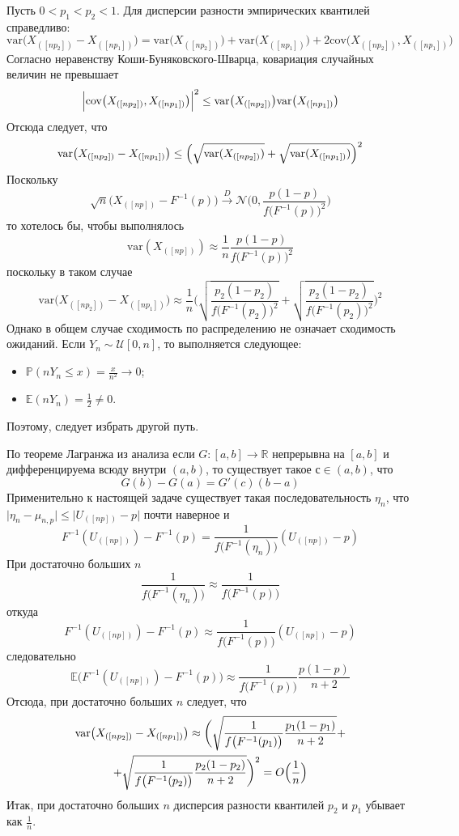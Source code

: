 \documentclass[a4paper]{article}
\newcommand{\Real}{\mathbb{R}}
\newcommand{\Ncal}{\mathcal{N}}
\newcommand{\ex}[0]{{\mathbb{E}}}
\newcommand{\pr}[0]{{\mathbb{P}}}
\newcommand{\var}[0]{\text{var}}
\begin{document}
Пусть $0<p_1<p_2<1$. Для дисперсии разности эмпирических квантилей справедливо:
\[
\var\bigl(X_{([np_2])}-X_{([np_1])}\bigr)
= \var\bigl(X_{([np_2])}\bigr) +\var\bigl(X_{([np_1])}\bigr)
	+2 \text{cov}\bigl(X_{([np_2])},X_{([np_1])}\bigr)
\]
Согласно неравенству Коши-Буняковского-Шварца, ковариация случайных величин не превышает
\[
\Bigl\lvert \text{cov}\bigl(X_{([np_2])},X_{([np_1])}\bigr)\Bigr\rvert^2
\leq \var\bigl(X_{([np_2])}\bigr)\var\bigl(X_{([np_1])}\bigr)
\]
Отсюда следует, что
\[
\var\bigl(X_{([np_2])}-X_{([np_1])}\bigr)
\leq \Bigl( \sqrt{\var(X_{([np_2])})} + \sqrt{\var(X_{([np_1])})} \Bigr)^2
\]
Поскольку
\[
\sqrt{n}\bigl(X_{([np])}-F^{-1}(p)\bigr)
\overset{D}{\to}
\Ncal\bigl(0,\frac{p(1-p)}{f\bigl(F^{-1}(p)\bigr)^2}\bigr)
\]
то хотелось бы, чтобы выполнялось
\[\var(X_{([np])}) \approx \frac{1}{n}\frac{p(1-p)}{f\bigl(F^{-1}(p)\bigr)^2}\]
поскольку в таком случае
\[
\var\bigl(X_{([np_2])}-X_{([np_1])}\bigr)
\approx \frac{1}{n}\biggl( \sqrt{ \frac{p_2(1-p_2)}{f\bigl(F^{-1}(p_2)\bigr)^2}}
	+ \sqrt{ \frac{p_2(1-p_2)}{f\bigl(F^{-1}(p_2)\bigr)^2}} \biggr)^2
\]
Однако в общем случае сходимость по распределению не означает сходимость ожиданий.
Если $Y_n\sim \mathcal{U}[0,n]$, то выполняется следующее:
\begin{itemize}
	\item $\pr( n Y_n \leq x) = \frac{x}{n^2}\to 0$;
	\item $\ex(n Y_n) = \frac{1}{2} \neq 0$.
\end{itemize}
Поэтому, следует избрать другой путь.

По теореме Лагранжа из анализа если $G:[a,b]\to\Real$ непрерывна на $[a,b]$ и
дифференцируема всюду внутри $(a,b)$, то существует такое $с\in (a,b)$, что
\[ G(b) - G(a) = G'(c) (b-a) \]
Применительно к настоящей задаче существует такая последовательность $\eta_n$, что
$\lvert \eta_n - \mu_{n,p}\rvert\leq \lvert U_{([np])} - p\rvert$ почти
наверное и
\[
F^{-1}(U_{([np])}) - F^{-1}(p)
= \frac{1}{f\bigl(F^{-1}(\eta_n)\bigr)} (U_{([np])}-p)
\]
При достаточно больших $n$
\[
\frac{1}{f\bigl(F^{-1}(\eta_n)\bigr)} \approx \frac{1}{f\bigl(F^{-1}(p)\bigr)}
\]
откуда
\[
F^{-1}(U_{([np])}) - F^{-1}(p)
\approx \frac{1}{f\bigl(F^{-1}(p)\bigr)} (U_{([np])}-p)
\]
следовательно
\[
\ex\bigl(F^{-1}(U_{([np])}) - F^{-1}(p)\bigr)
\approx \frac{1}{f\bigl(F^{-1}(p)\bigr)} \frac{p(1-p)}{n+2}
\]
Отсюда, при достаточно больших $n$ следует, что
\begin{multline*}
\var\bigl(X_{([np_2])}-X_{([np_1])}\bigr)
\approx \biggl(
\sqrt{\frac{1}{f\bigl(F^{-1}(p_1)\bigr)} \frac{p_1(1-p_1)}{n+2}} + \\
+ \sqrt{\frac{1}{f\bigl(F^{-1}(p_2)\bigr)} \frac{p_2(1-p_2)}{n+2}}
\biggr)^2 = O\Bigl(\frac{1}{{n}}\Bigr)
\end{multline*}
Итак, при достаточно больших $n$ дисперсия разности квантилей $p_2$ и $p_1$
убывает как $\frac{1}{n}$.
\end{document}
